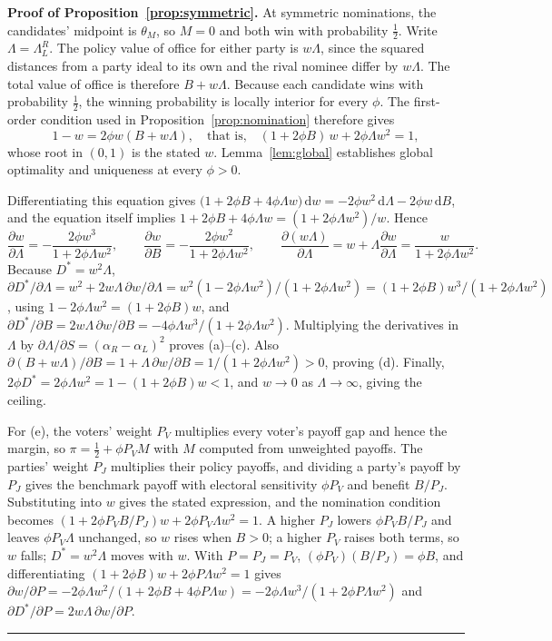 \documentclass[12pt,letterpaper]{article}
\newenvironment{proof}[1][Proof]{\noindent\textbf{#1.} }{\ \rule{0.5em}{0.5em}}
\begin{document}
\begin{proof}[Proof of Proposition~\ref{prop:symmetric}]
At symmetric nominations, the candidates' midpoint is $\theta_M$, so $M=0$ and both win with probability $\tfrac12$. Write $\Lambda=\Lambda_L^R$. The policy value of office for either party is $w\Lambda$, since the squared distances from a party ideal to its own and the rival nominee differ by $w\Lambda$. The total value of office is therefore $B+w\Lambda$. Because each candidate wins with probability $\tfrac12$, the winning probability is locally interior for every $\phi$. The first-order condition used in Proposition~\ref{prop:nomination} therefore gives
\[
1-w=2\phi w(B+w\Lambda),
\quad\text{that is,}\quad (1+2\phi B)\,w+2\phi\Lambda w^2=1,
\]
whose root in $(0,1)$ is the stated $w$. Lemma~\ref{lem:global} establishes global optimality and uniqueness at every $\phi>0$.

Differentiating this equation gives $\big(1+2\phi B+4\phi\Lambda w\big)\,\mathrm{d}w=-2\phi w^2\,\mathrm{d}\Lambda-2\phi w\,\mathrm{d}B$, and the equation itself implies $1+2\phi B+4\phi\Lambda w=(1+2\phi\Lambda w^2)/w$. Hence
\[
\frac{\partial w}{\partial\Lambda}=-\frac{2\phi w^3}{1+2\phi\Lambda w^2},\qquad
\frac{\partial w}{\partial B}=-\frac{2\phi w^2}{1+2\phi\Lambda w^2},\qquad
\frac{\partial(w\Lambda)}{\partial\Lambda}=w+\Lambda\frac{\partial w}{\partial\Lambda}=\frac{w}{1+2\phi\Lambda w^2}.
\]
Because $D^*=w^2\Lambda$, $\partial D^*/\partial\Lambda=w^2+2w\Lambda\,\partial w/\partial\Lambda=w^2(1-2\phi\Lambda w^2)/(1+2\phi\Lambda w^2)=(1+2\phi B)w^3/(1+2\phi\Lambda w^2)$, using $1-2\phi\Lambda w^2=(1+2\phi B)w$, and $\partial D^*/\partial B=2w\Lambda\,\partial w/\partial B=-4\phi\Lambda w^3/(1+2\phi\Lambda w^2)$. Multiplying the derivatives in $\Lambda$ by $\partial\Lambda/\partial S=(\alpha_R-\alpha_L)^2$ proves (a)--(c). Also $\partial(B+w\Lambda)/\partial B=1+\Lambda\,\partial w/\partial B=1/(1+2\phi\Lambda w^2)>0$, proving (d). Finally, $2\phi D^*=2\phi\Lambda w^2=1-(1+2\phi B)w<1$, and $w\to0$ as $\Lambda\to\infty$, giving the ceiling.

For (e), the voters' weight $P_V$ multiplies every voter's payoff gap and hence the margin, so $\pi=\tfrac12+\phi P_VM$ with $M$ computed from unweighted payoffs. The parties' weight $P_J$ multiplies their policy payoffs, and dividing a party's payoff by $P_J$ gives the benchmark payoff with electoral sensitivity $\phi P_V$ and benefit $B/P_J$. Substituting into $w$ gives the stated expression, and the nomination condition becomes $(1+2\phi P_VB/P_J)w+2\phi P_V\Lambda w^2=1$. A higher $P_J$ lowers $\phi P_VB/P_J$ and leaves $\phi P_V\Lambda$ unchanged, so $w$ rises when $B>0$; a higher $P_V$ raises both terms, so $w$ falls; $D^*=w^2\Lambda$ moves with $w$. With $P=P_J=P_V$, $(\phi P_V)(B/P_J)=\phi B$, and differentiating $(1+2\phi B)w+2\phi P\Lambda w^2=1$ gives $\partial w/\partial P=-2\phi\Lambda w^2/(1+2\phi B+4\phi P\Lambda w)=-2\phi\Lambda w^3/(1+2\phi P\Lambda w^2)$ and $\partial D^*/\partial P=2w\Lambda\,\partial w/\partial P$.
\end{proof}
\end{document}

